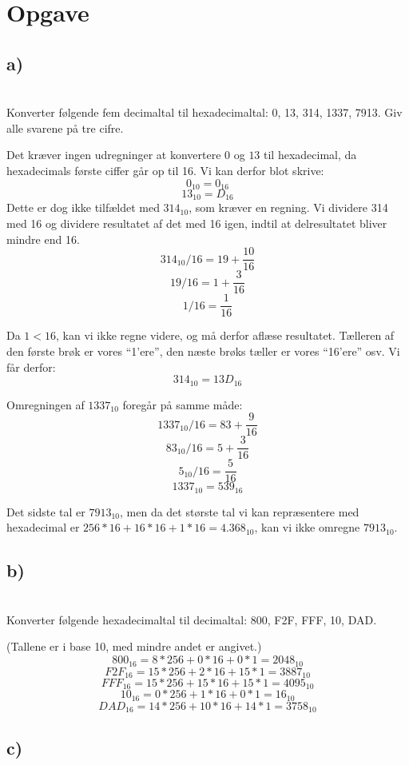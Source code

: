 \documentclass[a4,11pt]{article}
\newcommand{\tb}[1]{\textbf{#1}\\}
\begin{document}
\section{Opgave}

\subsection{a)}
\tb{}

Konverter følgende fem decimaltal til hexadecimaltal: 0, 13, 314, 1337, 7913. Giv alle svarene på tre cifre.

Det kræver ingen udregninger at konvertere $0$ og $13$ til hexadecimal, da hexadecimals første ciffer går op til 16. Vi kan derfor blot skrive: 
$$0_{10} = 0_{16}$$
$$13_{10} = D_{16}$$
Dette er dog ikke tilfældet med $314_{10}$, som kræver en regning. Vi dividere 314 med 16 og dividere resultatet af det med 16 igen, indtil at delresultatet bliver mindre end 16.
$$314_{10}/16 = 19 + \frac{10}{16}$$
$$19/16 = 1 + \frac{3}{16}$$
$$1/16 = \frac{1}{16}$$

Da $1 < 16$, kan vi ikke regne videre, og må derfor aflæse resultatet. Tælleren af den første brøk er vores ``1'ere'', den næste brøks tæller er vores ``16'ere'' osv. Vi får derfor:
$$314_{10} = 13D_{16}$$

Omregningen af $1337_{10}$ foregår på samme måde:
$$1337_{10}/16 = 83 + \frac{9}{16}$$
$$83_{10}/16 = 5 + \frac{3}{16}$$
$$5_{10}/16 = \frac{5}{16}$$
$$1337_{10} = 539_{16}$$

Det sidste tal er $7913_{10}$, men da det største tal vi kan repræsentere med hexadecimal er $256*16+16*16+1*16 = 4.368_{10}$, kan vi ikke omregne $7913_{10}$.

\subsection{b)}
\tb{}

Konverter følgende hexadecimaltal til decimaltal: 800, F2F, FFF, 10, DAD. 

(Tallene er i base 10, med mindre andet er angivet.)
$$ 800_{16} = 8*256 + 0 * 16 + 0 * 1 = 2048_{10}$$
$$ F2F_{16} = 15 * 256 + 2 * 16 + 15 * 1 = 3887_{10}$$
$$ FFF_{16} = 15 * 256 + 15 * 16 + 15 * 1 = 4095_{10}$$
$$ 10_{16} = 0* 256 + 1 * 16 + 0 * 1 = 16_{10}$$
$$ DAD_{16} = 14 * 256 + 10 * 16 + 14 * 1 = 3758_{10}$$

\subsection{c)}
\tb{}
\end{document}
